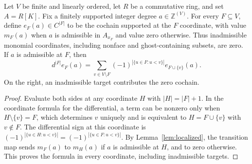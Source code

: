 \begin{lemma}\label{lem:cech-basis-action}
Let $V$ be finite and linearly ordered, let $R$ be a commutative ring,
and set $A=R[K]$. Fix a finitely supported integer degree
$a\in\mathbb Z^{(V)}$. For every $F\subseteq V$, define
$e_F(a)\in C^{|F|}$ to be the cochain supported at the $F$ coordinate,
with value $m_F(a)$ when $a$ is admissible in $A_{x_F}$ and value zero
otherwise. Thus inadmissible monomial coordinates, including nonface and
ghost-containing subsets, are zero. If $a$ is admissible at $F$, then
\[
 d^{|F|}e_F(a)=\sum_{v\in V\setminus F}
 (-1)^{|\{u\in F:u<v\}|}e_{F\cup\{v\}}(a).
\]
On the right, an inadmissible target contributes the zero cochain.
\leanok
\end{lemma}
\begin{proof}
Evaluate both sides at any coordinate $H$ with $|H|=|F|+1$. In the
coordinate formula for the differential, a term can be nonzero only when
$H\setminus\{v\}=F$, which determines $v$ uniquely and is equivalent to
$H=F\cup\{v\}$ with $v\notin F$. The differential sign at this coordinate
is $(-1)^{|\{u\in H:u<v\}|}=(-1)^{|\{u\in F:u<v\}|}$. By
Lemma~\ref{lem:localized}, the transition map sends $m_F(a)$ to $m_H(a)$ if
$a$ is admissible at $H$, and to zero otherwise. This proves the formula in
every coordinate, including inadmissible targets.
\end{proof}

